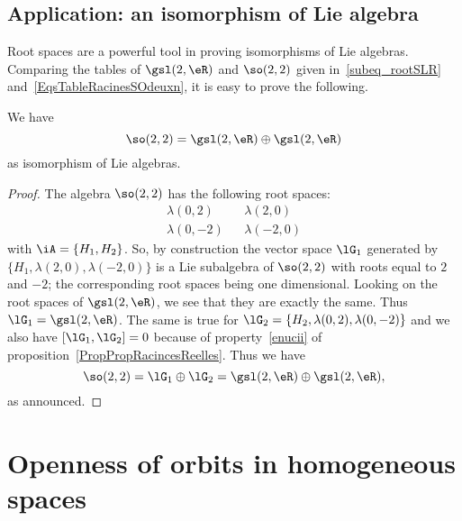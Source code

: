 \subsection{Application: an isomorphism of Lie algebra}
\label{sssIsomsoslplussl}

Root spaces are a powerful tool in proving isomorphisms of Lie algebras. Comparing the tables of $\gsl(2,\eR)$ and $\so(2,2)$ given in~\ref{subeq_rootSLR} and~\ref{EqsTableRacinesSOdeuxn}, it is easy to prove the following.

\begin{proposition}
	We have
	\begin{equation}
		\so(2,2)=\gsl(2,\eR)\oplus\gsl(2,\eR)
	\end{equation}
	as isomorphism of Lie algebras.
\end{proposition}

\begin{proof}
	The algebra $\so(2,2)$ has the following root spaces:
	\begin{align*}
		\lambda(0,2)  &  & \lambda(2,0)  \\
		\lambda(0,-2) &  & \lambda(-2,0)
	\end{align*}
	with $\iA=\{ H_1,H_2 \}$. So, by construction the vector space $\lG_1$ generated by $\{ H_1,\lambda(2,0),\lambda(-2,0) \}$ is a Lie subalgebra of $\so(2,2)$ with roots equal to $2$ and $-2$; the corresponding root spaces being one dimensional. Looking on the root spaces of $\gsl(2,\eR)$, we see that they are exactly the same. Thus $\lG_1=\gsl(2,\eR)$. The same is true for $\lG_2=\{ H_2,\lambda(0,2),\lambda(0,-2)  \}$ and we also have $[\lG_1,\lG_2]=0$ because of property~\ref{enucii} of proposition~\ref{PropPropRacincesReelles}. Thus we have
	\[
		\so(2,2)=\lG_1\oplus\lG_2=\gsl(2,\eR)\oplus\gsl(2,\eR),
	\]
	as announced.
\end{proof}

\section{Openness of orbits in homogeneous spaces}
\label{SecDNqdJOp}

